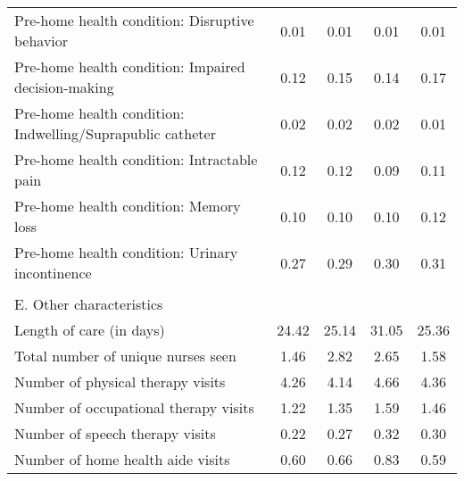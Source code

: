 \documentclass[final,12pt]{article}
\begin{document}
\begin{singlespace}
\begin{table}[H]
\begin{threeparttable}
\begin{tabular}{l*{4}c}
Pre-home health condition: Disruptive behavior & 0.01  & 0.01  & 0.01  & 0.01 \\
Pre-home health condition: Impaired decision-making & 0.12  & 0.15  & 0.14  & 0.17 \\
Pre-home health condition: Indwelling/Suprapublic catheter & 0.02  & 0.02  & 0.02  & 0.01 \\
Pre-home health condition: Intractable pain & 0.12  & 0.12  & 0.09  & 0.11 \\
Pre-home health condition: Memory loss & 0.10  & 0.10  & 0.10  & 0.12 \\
Pre-home health condition: Urinary incontinence & 0.27  & 0.29  & 0.30  & 0.31 \\

\\
\multicolumn{5}{l}{E. Other characteristics}\\
Length of care (in days) & 24.42  & 25.14  & 31.05  & 25.36 \\
Total number of unique nurses seen & 1.46  & 2.82  & 2.65  & 1.58 \\
Number of physical therapy visits & 4.26  & 4.14  & 4.66  & 4.36 \\
Number of occupational therapy visits & 1.22  & 1.35  & 1.59  & 1.46 \\
Number of speech therapy visits & 0.22  & 0.27  & 0.32  & 0.30 \\
Number of home health aide visits & 0.60  & 0.66  & 0.83  & 0.59 \\


\end{tabular}
\end{threeparttable}
\end{table}
\end{singlespace}
\end{document}
